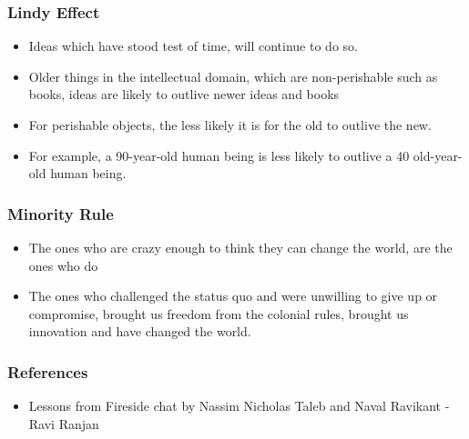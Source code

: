 \begin{frame}[fragile]\frametitle{Lindy Effect}

\begin{itemize}
\item Ideas which have stood test of time, will continue to do so.
\item Older things in the intellectual domain, which are non-perishable such as books, ideas are likely to outlive newer ideas and books
\item For perishable objects, the less likely it is for the old to outlive the new. \item For example, a 90-year-old human being is less likely to outlive a 40 old-year-old human being.
\end{itemize}
\end{frame}

\begin{frame}[fragile]\frametitle{Minority Rule}

\begin{itemize}
\item The ones who are crazy enough to think they can change the world, are the ones who do
\item The ones who challenged the status quo and were unwilling to give up or compromise, brought us freedom from the colonial rules, brought us innovation and have changed the world.
\end{itemize}
\end{frame}

\begin{frame}[fragile]\frametitle{References}
\begin{itemize}
\item Lessons from Fireside chat by Nassim Nicholas Taleb and Naval Ravikant
- Ravi Ranjan
\end{itemize}
\end{frame}